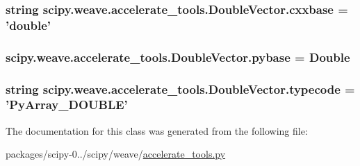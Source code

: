 \subsubsection[{cxxbase}]{\setlength{\rightskip}{0pt plus 5cm}string scipy.\+weave.\+accelerate\+\_\+tools.\+Double\+Vector.\+cxxbase = 'double'\hspace{0.3cm}{\ttfamily [static]}}\label{classscipy_1_1weave_1_1accelerate__tools_1_1DoubleVector_a1f60bf2331ee759fd470e547eb56a5dd}
\hypertarget{classscipy_1_1weave_1_1accelerate__tools_1_1DoubleVector_acf653166b1c668abfdc189b490c6864e}{}
\subsubsection[{pybase}]{\setlength{\rightskip}{0pt plus 5cm}scipy.\+weave.\+accelerate\+\_\+tools.\+Double\+Vector.\+pybase = {\bf Double}\hspace{0.3cm}{\ttfamily [static]}}\label{classscipy_1_1weave_1_1accelerate__tools_1_1DoubleVector_acf653166b1c668abfdc189b490c6864e}
\hypertarget{classscipy_1_1weave_1_1accelerate__tools_1_1DoubleVector_ab43eb195e28503b79570a4570136571a}{}
\subsubsection[{typecode}]{\setlength{\rightskip}{0pt plus 5cm}string scipy.\+weave.\+accelerate\+\_\+tools.\+Double\+Vector.\+typecode = 'Py\+Array\+\_\+\+D\+O\+U\+B\+L\+E'\hspace{0.3cm}{\ttfamily [static]}}\label{classscipy_1_1weave_1_1accelerate__tools_1_1DoubleVector_ab43eb195e28503b79570a4570136571a}


The documentation for this class was generated from the following file\+:\begin{DoxyCompactItemize}
\item 
packages/scipy-\/0../scipy/weave/\hyperlink{accelerate__tools_8py}{accelerate\+\_\+tools.\+py}\end{DoxyCompactItemize}
